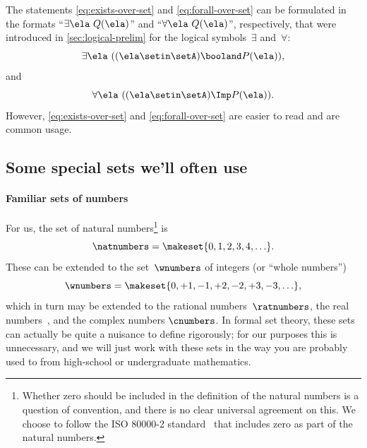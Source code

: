 \begin{remark}
    The statements \cref{eq:exists-over-set} and \cref{eq:forall-over-set} can be formulated in the formats ``$\exists \ela \ Q(\ela)$'' and ``$\forall \ela \ Q(\ela)$'', respectively, that were introduced in \cref{sec:logical-prelim} for the logical symbols~$\exists$ and~$\forall$:
    \begin{equation}
        \exists \ela \  ((\ela \setin \setA) \booland P(\ela)),
    \end{equation}
    and
    \begin{equation}
        \forall \ela\  ((\ela\setin \setA) \Imp P(\ela)).
    \end{equation}
    However, \cref{eq:exists-over-set} and \cref{eq:forall-over-set} are easier to read and are common usage.
\end{remark}

\subsection{Some special sets we'll often use}

\label{sec:special-sets}
\label{sec:natnumbers}
\label{sec:wnumbers}
\label{sec:ratnumbers}
\label{sec:reals}


\paragraph{Familiar sets of numbers}
For us, the set of natural numbers\footnote{
    Whether zero should be included in the definition of the natural numbers is a question of convention, and there is no clear universal agreement on this.
    We choose to follow the ISO 80000-2 standard~\cite{ISO:2009:IQU} that includes zero as part of the natural numbers.
} is
%
\begin{equation}
    \natnumbers = \makeset{0, 1, 2, 3, 4, \ldots }.
\end{equation}
%
These can be extended to the set~$\wnumbers$ of integers (or ``whole numbers'')
\begin{equation}
    \wnumbers = \makeset{ 0, +1, -1, +2, -2, +3, -3, \ldots},
\end{equation}
%
which in turn may be extended to the  rational numbers~$\ratnumbers$, the real numbers~\reals, and the complex numbers $\cnumbers$.
In formal set theory, these sets can actually be quite a nuisance to define rigorously; for our purposes this is unnecessary, and we will just work with these sets in the way you are probably used to from high-school or undergraduate mathematics.


